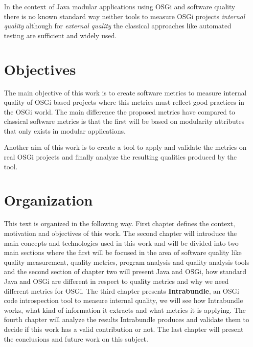 In the context of Java modular applications using OSGi and software quality there is no known standard way neither tools to measure OSGi projects \textit{internal quality} \citep{Hamza 2013} although for \emph{external quality} the classical approaches like automated testing are sufficient and widely used.

        
\section{Objectives}
The main objective of this work is to create software metrics to measure internal quality of OSGi based projects where this metrics must reflect good practices in the OSGi world. The main difference the proposed metrics have compared to classical software metrics is that the first will be based on modularity attributes that only exists in modular applications.   

Another aim of this work is to create a tool to apply and validate the metrics on real OSGi projects and finally analyze the resulting qualities produced by the tool.  

 
\section{Organization}

This text is organized in the following way. First chapter defines the context, motivation and objectives of this work. The second chapter will introduce the main concepts and technologies used in this work and will be divided into two main sections where the first will be focused in the area of software quality like quality measurement, quality metrics, program analysis and quality analysis tools and the second section of chapter two will present Java and OSGi, how standard Java and OSGi are different in respect to quality metrics and why we need different metrics for OSGi. The third chapter presents \textbf{Intrabundle}, an OSGi code introspection tool to measure internal quality, we will see how Intrabundle works, what kind of information it extracts and what metrics it is applying. The fourth chapter will analyze the results Intrabundle produces and validate them to decide if this work has a valid contribution or not. The last chapter will present the conclusions and future work on this subject.